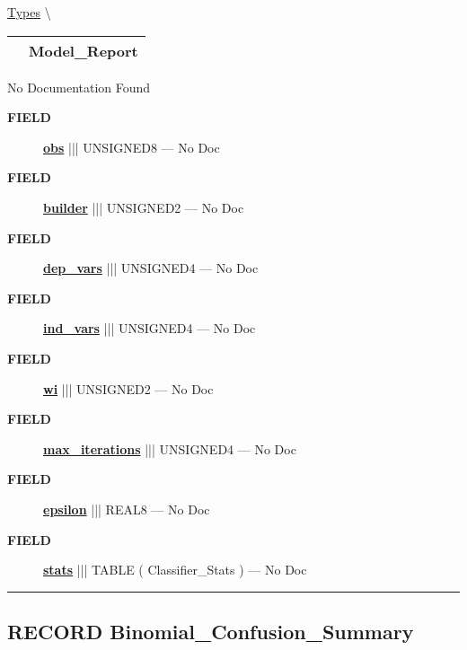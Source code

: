\hypertarget{ecldoc:logisticregression.types.model_report}{}
\hspace{0pt} \hyperlink{ecldoc:LogisticRegression.Types}{Types} \textbackslash 

{\renewcommand{\arraystretch}{1.5}
\begin{tabularx}{\textwidth}{|>{\raggedright\arraybackslash}l|X|}
\hline
\hspace{0pt}\mytexttt{\color{red} } & \textbf{Model\_Report} \\
\hline
\end{tabularx}
}

\par





No Documentation Found







\par
\begin{description}
\item [\colorbox{tagtype}{\color{white} \textbf{\textsf{FIELD}}}] \textbf{\underline{obs}} ||| UNSIGNED8 --- No Doc
\item [\colorbox{tagtype}{\color{white} \textbf{\textsf{FIELD}}}] \textbf{\underline{builder}} ||| UNSIGNED2 --- No Doc
\item [\colorbox{tagtype}{\color{white} \textbf{\textsf{FIELD}}}] \textbf{\underline{dep\_vars}} ||| UNSIGNED4 --- No Doc
\item [\colorbox{tagtype}{\color{white} \textbf{\textsf{FIELD}}}] \textbf{\underline{ind\_vars}} ||| UNSIGNED4 --- No Doc
\item [\colorbox{tagtype}{\color{white} \textbf{\textsf{FIELD}}}] \textbf{\underline{wi}} ||| UNSIGNED2 --- No Doc
\item [\colorbox{tagtype}{\color{white} \textbf{\textsf{FIELD}}}] \textbf{\underline{max\_iterations}} ||| UNSIGNED4 --- No Doc
\item [\colorbox{tagtype}{\color{white} \textbf{\textsf{FIELD}}}] \textbf{\underline{epsilon}} ||| REAL8 --- No Doc
\item [\colorbox{tagtype}{\color{white} \textbf{\textsf{FIELD}}}] \textbf{\underline{stats}} ||| TABLE ( Classifier\_Stats ) --- No Doc
\end{description}





\rule{\linewidth}{0.5pt}
\subsection*{\textsf{\colorbox{headtoc}{\color{white} RECORD}
Binomial\_Confusion\_Summary}}

